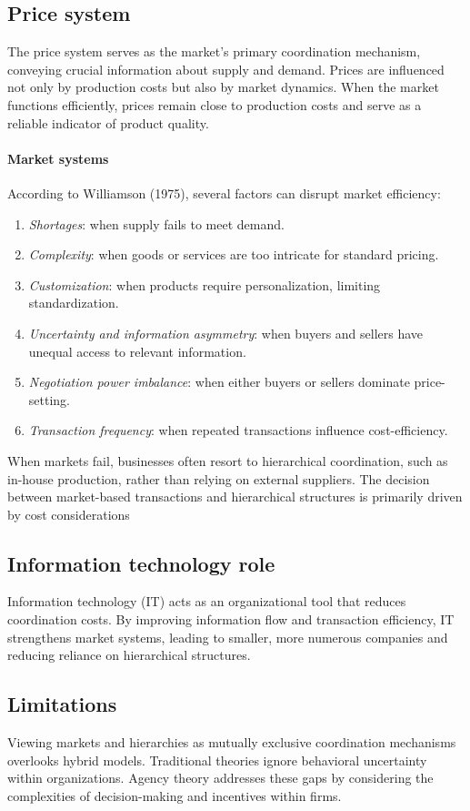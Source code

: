 \subsection{Price system}
The price system serves as the market's primary coordination mechanism, conveying crucial information about supply and demand. 
Prices are influenced not only by production costs but also by market dynamics. 
When the market functions efficiently, prices remain close to production costs and serve as a reliable indicator of product quality.

\paragraph*{Market systems}
According to Williamson (1975), several factors can disrupt market efficiency:
\begin{enumerate}
    \item \textit{Shortages}: when supply fails to meet demand.
    \item \textit{Complexity}: when goods or services are too intricate for standard pricing.
    \item \textit{Customization}: when products require personalization, limiting standardization.
    \item \textit{Uncertainty and information asymmetry}: when buyers and sellers have unequal access to relevant information.
    \item \textit{Negotiation power imbalance}: when either buyers or sellers dominate price-setting.
    \item \textit{Transaction frequency}: when repeated transactions influence cost-efficiency.
\end{enumerate}
\noindent When markets fail, businesses often resort to hierarchical coordination, such as in-house production, rather than relying on external suppliers. 
The decision between market-based transactions and hierarchical structures is primarily driven by cost considerations

\subsection{Information technology role}
Information technology (IT) acts as an organizational tool that reduces coordination costs. 
By improving information flow and transaction efficiency, IT strengthens market systems, leading to smaller, more numerous companies and reducing reliance on hierarchical structures.

\subsection{Limitations}
Viewing markets and hierarchies as mutually exclusive coordination mechanisms overlooks hybrid models.
Traditional theories ignore behavioral uncertainty within organizations.
Agency theory addresses these gaps by considering the complexities of decision-making and incentives within firms.
